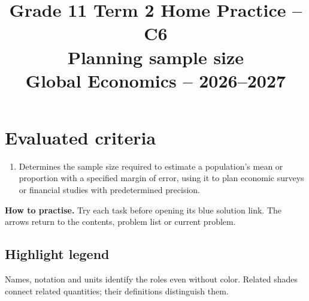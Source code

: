 \makeatletter
{}
\makeatother




\CoordinatedTermTwoPalette
\usepackage{needspace}
\usepackage{titling}
\setlength{\droptitle}{-2em}
\pretitle{\par\begingroup\centering\LARGE}
\posttitle{\par\endgroup}
\preauthor{}\postauthor{}
\predate{}\postdate{}
\maketitlehookd{\vspace{-1em}}
\linespread{1.12}
\setlength{\parskip}{5pt}

\title{Grade 11 Term 2 Home Practice -- C6\\\large Planning sample size\\[0.25em]
	\normalsize Global Economics -- 2026--2027}
\author{}
\date{}


	\maketitle

	\setcounter{tocdepth}{1}
	\setcounter{secnumdepth}{2}
	\label{toc}
	\tableofcontents

	\section*{Evaluated criteria}
	\begin{enumerate}[label=\textbf{C\arabic*},start=6]
		\item Determines the sample size required to estimate a population's mean or proportion with a specified margin of error, using it to plan economic surveys or financial studies with predetermined precision.
	\end{enumerate}

	\textbf{How to practise.} Try each task before opening its blue solution link. The arrows return to the contents, problem list or current problem.


\subsection*{Highlight legend}
\label{tab:highlight-legend}
Names, notation and units identify the roles even without color. Related shades connect related quantities; their definitions distinguish them.

